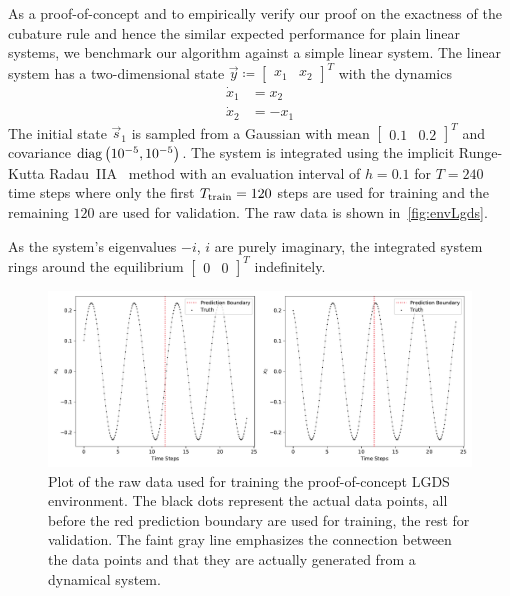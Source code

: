 			As a proof-of-concept and to empirically verify our proof on the exactness of the cubature rule and hence the similar expected performance for plain linear systems, we benchmark our algorithm against a simple linear system. The linear system has a two-dimensional state \( \vec{y} \coloneqq \begin{bmatrix} x_1 & x_2 \end{bmatrix}^T \) with the dynamics
			\begin{align*}
				\dot{x}_1 &= x_2 \\
				\dot{x}_2 &= -x_1
			\end{align*}
			The initial state \( \vec{s}_1 \) is sampled from a Gaussian with mean \( \begin{bmatrix} 0.1 & 0.2 \end{bmatrix}^T \) and covariance \( \operatorname{diag}\big(10^{-5}, 10^{-5}\big) \). The system is integrated using the implicit Runge-Kutta Radau~IIA~\cite{guglielmiImplementingRadauIIA2001} method with an evaluation interval of \( h = 0.1 \) for \( T = 240 \) time steps where only the first \( T_{\mathrm{train}} = 120 \) steps are used for training and the remaining \(120\) are used for validation. The raw data is shown in~\autoref{fig:envLgds}.

			As the system's eigenvalues \( -i \), \( i \) are purely imaginary, the integrated system rings around the equilibrium \( \begin{bmatrix} 0 & 0 \end{bmatrix}^T \) indefinitely.

			\begin{figure}
				\centering
				\includegraphics[width=\linewidth]{figures/experiments/environments/observations-lgds-N0.pdf}
				\caption[Raw data of the proof-of-concept LGDS environment]{Plot of the raw data used for training the proof-of-concept LGDS environment. The black dots represent the actual data points, all before the red prediction boundary are used for training, the rest for validation. The faint gray line emphasizes the connection between the data points and that they are actually generated from a dynamical system.}
				\label{fig:envLgds}
			\end{figure}

